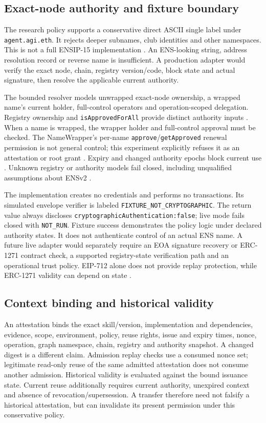 \documentclass[11pt,a4paper]{article}
\newcommand{\code}[1]{\nolinkurl{#1}}
\begin{document}
\subsection{Exact-node authority and fixture boundary}
The research policy supports a conservative direct ASCII single label under \code{agent.agi.eth}. It rejects deeper subnames, club identities and other namespaces. This is not a full ENSIP-15 implementation \citep{ensnames}. An ENS-looking string, address resolution record or reverse name is insufficient. A production adapter would verify the exact node, chain, registry version/code, block state and actual signature, then resolve the applicable current authority.

The bounded resolver models unwrapped exact-node ownership, a wrapped name's current holder, full-control operators and operation-scoped delegation. Registry ownership and \code{isApprovedForAll} provide distinct authority inputs \citep{ensregistry}. When a name is wrapped, the wrapper holder and full-control approval must be checked. The NameWrapper's per-name \code{approve}/\code{getApproved} renewal permission is not general control; this experiment explicitly refuses it as an attestation or root grant \citep{enswrapper}. Expiry and changed authority epochs block current use \citep{ensexpiry}. Unknown registry or authority models fail closed, including unqualified assumptions about ENSv2 \citep{ensv2}.

The implementation creates no credentials and performs no transactions. Its simulated envelope verifier is labeled \code{FIXTURE_NOT_CRYPTOGRAPHIC}. The return value always discloses \code{cryptographicAuthentication:false}; live mode fails closed with \code{NOT_RUN}. Fixture success demonstrates the policy logic under declared authority states. It does not authenticate control of an actual ENS name. A future live adapter would separately require an EOA signature recovery or ERC-1271 contract check, a supported registry-state verification path and an operational trust policy. EIP-712 alone does not provide replay protection, while ERC-1271 validity can depend on state \citep{eip712,eip1271}.

\subsection{Context binding and historical validity}
An attestation binds the exact skill/version, implementation and dependencies, evidence, scope, environment, policy, reuse rights, issue and expiry times, nonce, operation, graph namespace, chain, registry and authority snapshot. A changed digest is a different claim. Admission replay checks use a consumed nonce set; legitimate read-only reuse of the same admitted attestation does not consume another admission. Historical validity is evaluated against the bound issuance state. Current reuse additionally requires current authority, unexpired context and absence of revocation/supersession. A transfer therefore need not falsify a historical attestation, but can invalidate its present permission under this conservative policy.
\end{document}
